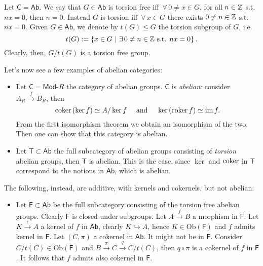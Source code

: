 \begin{ex}
	Let $\mathsf{C} = \mathsf{Ab}$. We say that $G \in \mathsf{Ab}$ is torsion free iff $\,\forall\,  0 \neq x \in G$, for all $n \in \mathbb{Z}$ s.t. $nx = 0$, then $n = 0$.
	Instead $G$ is torsion iff $\,\forall\,  x \in G$ there exists $0 \neq n \in \mathbb{Z}$ s.t. $nx = 0$.
	Given $G \in \mathsf{Ab}$, we denote by $t(G) \leq G$ the torsion subgroup of $G$, i.e.
	\begin{equation}
		t(G) := \left\{ x \in G \ \middle|\ \exists\, 0 \neq n \in \Z \text{ s.t. } nx = 0 \right\}
	.\end{equation} 
	Clearly, then, $G/t(G)$ is a torsion free group.

	Let's now see a few examples of abelian categories:
	\begin{itemize}
		\item Let $\mathsf{C} = \mathsf{Mod}\text{-}R$ the category of abelian groups.
			$\mathsf{C}$ is {\em abelian}: consider $A_R \xrightarrow{f} B_R$, then
			\begin{equation}
				\operatorname{coker} \left( \ker f \right) \simeq A/ \ker f \quad \text{ and } \quad
				\ker \left( \operatorname{coker} f \right) \simeq \operatorname{im} f
			.\end{equation} 
			From the first isomorphism theorem we obtain an isomorphism of the two.
			Then one can show that this category is abelian.
		\item Let $\mathsf{T} \subset \mathsf{Ab}$  the full subcategory of abelian groups consisting of {\em torsion} abelian groups, then $\mathsf{T}$ is abelian.
			This is the case, since $\ker$ and $\operatorname{coker}$ in $\mathsf{T}$ correspond to the notions in $\mathsf{Ab}$, which is abelian.
	\end{itemize}
	The following, instead, are additive, with kernels and cokernels, but not abelian:
	\begin{itemize}
		\item Let $\mathsf{F} \subset \mathsf{Ab}$ be the full subcategory consisting of the torsion free abelian groups.
			Clearly $\mathsf{F}$ is closed under subgroups.
			Let $A \xrightarrow{f} B$ a morphism in $\mathsf{F}$.
			Let $K \xrightarrow{\epsilon} A$ a kernel of $f$ in $\mathsf{Ab}$, clearly $K \hookrightarrow A$, hence $K \in \mathrm{Ob} \left(\mathsf{F}\right)$ and $f$ admits kernel in $\mathsf{F}$.
			Let $\left(C, \pi\right)$ a cokernel in $\mathsf{Ab}$. It might not be in $\mathsf{F}$.
			Consider $C/t(C) \in \mathrm{Ob} \left(\mathsf{F}\right)$ and $B \xrightarrow{\pi} C \xrightarrow{q} C/t(C)$, then $q \circ \pi$ is a cokernel of $f$ in $\mathsf{F}$.
			It follows that $f$ admits also cokernel in $\mathsf{F}$.


\end{itemize}
\end{ex}

